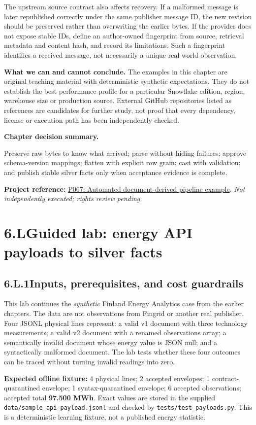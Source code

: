 \documentclass[11pt,twoside]{article}
\newcommand{\topic}[2]{\subsection*{#1\quad #2}}
\newcommand{\repo}[2]{\par\begingroup\fontsize{8.0}{9.6}\selectfont\sffamily\color{inkgray}\textbf{Project reference:} \href{#2}{#1}. \textit{Not independently executed; rights review pending.}\par\endgroup}
\begin{document}
The upstream source contract also affects recovery. If a malformed message is later republished correctly under the same publisher message ID, the new revision should be preserved rather than overwriting the earlier bytes. If the provider does not expose stable IDs, define an author-owned fingerprint from source, retrieval metadata and content hash, and record its limitations. Such a fingerprint identifies a received message, not necessarily a unique real-world observation.

\textbf{What we can and cannot conclude.} The examples in this chapter are original teaching material with deterministic synthetic expectations. They do not establish the best performance profile for a particular Snowflake edition, region, warehouse size or production source. External GitHub repositories listed as references are candidates for further study, not proof that every dependency, license or execution path has been independently checked.

\begin{insight}\textbf{Chapter decision summary.}\par
Preserve raw bytes to know what arrived; parse without hiding failures; approve schema-version mappings; flatten with explicit row grain; cast with validation; and publish stable silver facts only when acceptance evidence is complete.\end{insight}
\repo{P067: Automated document-derived pipeline example}{https://github.com/Snowflake-Labs/sfguide-document-ai-pipeline-automation-in-snowflake}
\newpage
\section*{6.L\quad Guided lab: energy API payloads to silver facts}
\topic{6.L.1}{Inputs, prerequisites, and cost guardrails}
This lab continues the \emph{synthetic} Finland Energy Analytics case from the earlier chapters. The data are not observations from Fingrid or another real publisher. Four JSONL physical lines represent: a valid v1 document with three technology measurements; a valid v2 document with a renamed observations array; a semantically invalid document whose energy value is JSON null; and a syntactically malformed document. The lab tests whether these four outcomes can be traced without turning invalid readings into zero.

\textbf{Expected offline fixture:} 4 physical lines; 2 accepted envelopes; 1 contract-quarantined envelope; 1 syntax-quarantined envelope; 6 accepted observations; accepted total \textbf{97.500 MWh}. Exact values are stored in the supplied \texttt{data/sample\_api\_payload.jsonl} and checked by \texttt{tests/test\_payloads.py}. This is a deterministic learning fixture, not a published energy statistic.
\end{document}

